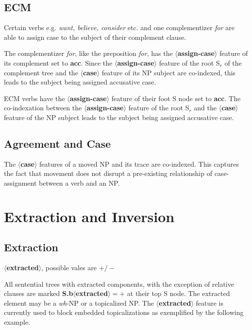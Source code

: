 
\subsection{ECM}
Certain verbs e.g. {\em want, believe, consider} etc. and one complementizer
{\em for} are able to assign case to the subject of their complement clause. 

The complementizer {\em for}, like the preposition {\em for}, has the
{\bf $\langle$assign-case$\rangle$} feature of its complement set to
{\bf acc}. Since the {\bf $\langle$assign-case$\rangle$} feature of
the root S$_{r}$ of the complement tree and the {\bf
$\langle$case$\rangle$} feature of its NP subject are co-indexed, this
leads to the subject being assigned accusative case.

ECM verbs have the {\bf $\langle$assign-case$\rangle$}  feature of their
foot S node set to {\bf acc}. The co-indexation between the 
{\bf $\langle$assign-case$\rangle$} feature of
the root S$_{r}$ and the {\bf $\langle$case$\rangle$} feature of the NP subject
leads to the subject being assigned accusative case.

\subsection{Agreement and Case}
The {\bf $\langle$case$\rangle$} features of a moved NP and its trace 
are co-indexed. This captures the fact that movement does not disrupt 
a pre-existing relationship of case-assignment between a verb and an NP.



\section{Extraction and Inversion}

\subsection{Extraction}
{\bf $\langle$extracted$\rangle$}, possible vales are {\bf $+/-$}

All sentential trees with extracted components, with the exception of
relative clauses are marked {\bf S.b$\langle$extracted$\rangle = +$}
at their top S node. The extracted element may be a {\em wh}-NP or a
topicalized NP. The {\bf $\langle$extracted$\rangle$} feature 
is currently used to block embedded topicalizations as exemplified
by the following example.

